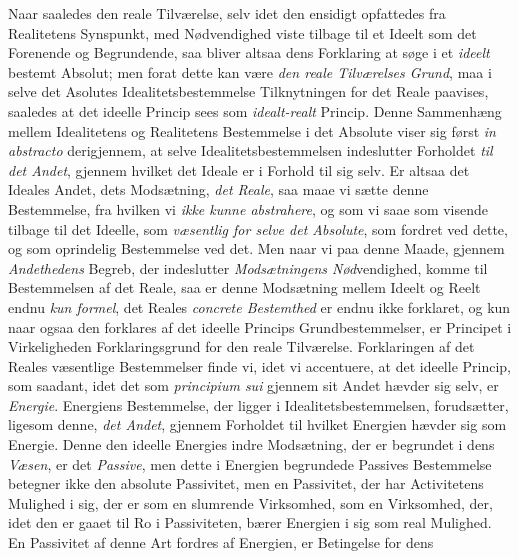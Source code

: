 Naar saaledes den reale Tilværelse, selv idet den ensidigt opfattedes fra
Realitetens Synspunkt, med Nødvendighed viste tilbage til et Ideelt som det
Forenende og Begrundende, saa bliver altsaa dens Forklaring at søge i et
\emph{ideelt} bestemt Absolut; men forat dette kan være \emph{den reale
Tilværelses Grund}, maa i selve det Asolutes Idealitetsbestemmelse
Tilknytningen for det Reale paavises, saaledes at det ideelle Princip sees som
\emph{idealt-realt} Princip. Denne Sammenhæng mellem Idealitetens og
Realitetens Bestemmelse i det Absolute viser sig først
\emph{\textit{in abstracto}}
 derigjennem, at selve Idealitetsbestemmelsen indeslutter Forholdet \emph{til
det Andet}, gjennem hvilket det Ideale er i Forhold til sig selv. Er altsaa
det Ideales Andet, dets Modsætning, \emph{det Reale}, saa maae vi sætte denne
Bestemmelse, fra hvilken vi \emph{ikke kunne abstrahere}, og som vi saae som
visende tilbage til det Ideelle, som \emph{væsentlig for selve det Absolute},
som fordret ved dette, og som oprindelig Bestemmelse ved det. Men naar vi paa
denne Maade, gjennem \emph{Andethedens} Begreb, der indeslutter
\emph{Modsætningens Nød}vendighed, komme til Bestemmelsen af det Reale, saa er
denne Modsætning mellem Ideelt og Reelt endnu \emph{kun formel}, det Reales
\emph{concrete Bestemthed} er endnu ikke forklaret, og kun naar ogsaa den
forklares af det ideelle Princips Grundbestemmelser, er Principet i
Virkeligheden Forklaringsgrund for den reale Tilværelse. Forklaringen af det
Reales væsentlige Bestemmelser finde vi, idet vi accentuere, at det ideelle
Princip, som saadant, idet det som \textit{principium sui} gjennem sit Andet
hævder sig selv, er \emph{Energie}. Energiens Bestemmelse, der ligger i
Idealitetsbestemmelsen, forudsætter, ligesom denne, \emph{det Andet}, gjennem
Forholdet til hvilket Energien hævder sig som Energie. Denne den ideelle
Energies indre Modsætning, der er begrundet i dens \emph{Væsen}, er det
\emph{Passive}, men dette i Energien begrundede Passives Bestemmelse betegner
ikke den absolute Passivitet, men en Passivitet, der har Activitetens Mulighed
i sig, der er som en slumrende Virksomhed, som en Virksomhed, der, idet den er
gaaet til Ro i Passiviteten, bærer Energien i sig som real Mulighed. En
Passivitet af denne Art fordres af Energien, er Betingelse for dens
